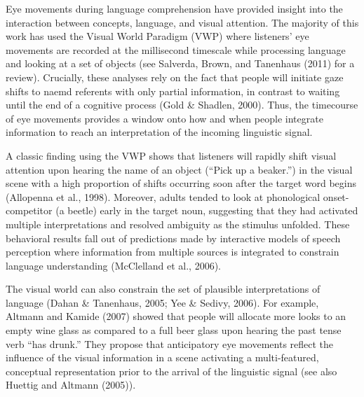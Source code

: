 \documentclass[english,floatsintext,man]{apa6}
\theoremstyle{definition}
\theoremstyle{definition}
\theoremstyle{definition}
\theoremstyle{remark}
\begin{document}
Eye movements during language comprehension have provided insight into
the interaction between concepts, language, and visual attention. The
majority of this work has used the Visual World Paradigm (VWP) where
listeners' eye movements are recorded at the millisecond timescale while
processing language and looking at a set of objects (see Salverda,
Brown, and Tanenhaus (2011) for a review). Crucially, these analyses
rely on the fact that people will initiate gaze shifts to naemd
referents with only partial information, in contrast to waiting until
the end of a cognitive process (Gold \& Shadlen, 2000). Thus, the
timecourse of eye movements provides a window onto how and when people
integrate information to reach an interpretation of the incoming
linguistic signal.

A classic finding using the VWP shows that listeners will rapidly shift
visual attention upon hearing the name of an object (\enquote{Pick up a
beaker.}) in the visual scene with a high proportion of shifts occurring
soon after the target word begins (Allopenna et al., 1998). Moreover,
adults tended to look at phonological onset-competitor (a beetle) early
in the target noun, suggesting that they had activated multiple
interpretations and resolved ambiguity as the stimulus unfolded. These
behavioral results fall out of predictions made by interactive models of
speech perception where information from multiple sources is integrated
to constrain language understanding (McClelland et al., 2006).

The visual world can also constrain the set of plausible interpretations
of language (Dahan \& Tanenhaus, 2005; Yee \& Sedivy, 2006). For
example, Altmann and Kamide (2007) showed that people will allocate more
looks to an empty wine glass as compared to a full beer glass upon
hearing the past tense verb \enquote{has drunk.} They propose that
anticipatory eye movements reflect the influence of the visual
information in a scene activating a multi-featured, conceptual
representation prior to the arrival of the linguistic signal (see also
Huettig and Altmann (2005)).
\end{document}
